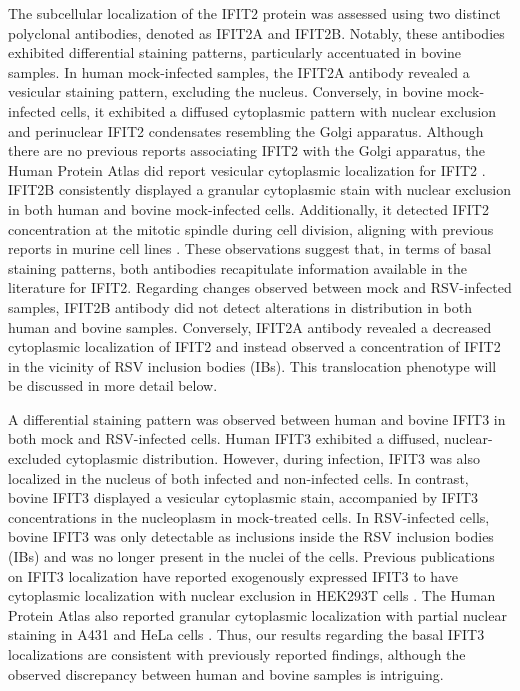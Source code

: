 The subcellular localization of the IFIT2 protein was assessed using two distinct polyclonal antibodies, denoted as IFIT2A and IFIT2B. Notably, these antibodies exhibited differential staining patterns, particularly accentuated in bovine samples. In human mock-infected samples, the IFIT2A antibody revealed a vesicular staining pattern, excluding the nucleus. Conversely, in bovine mock-infected cells, it exhibited a diffused cytoplasmic pattern with nuclear exclusion and perinuclear IFIT2 condensates resembling the Golgi apparatus. Although there are no previous reports associating IFIT2 with the Golgi apparatus, the Human Protein Atlas did report vesicular cytoplasmic localization for IFIT2 \cite{Thul2017AProteome}. IFIT2B consistently displayed a granular cytoplasmic stain with nuclear exclusion in both human and bovine mock-infected cells. Additionally, it detected IFIT2 concentration at the mitotic spindle during cell division, aligning with previous reports in murine cell lines \cite{Saha2006IdentificationProtein}. These observations suggest that, in terms of basal staining patterns, both antibodies recapitulate information available in the literature for IFIT2. Regarding changes observed between mock and RSV-infected samples, IFIT2B antibody did not detect alterations in distribution in both human and bovine samples. Conversely, IFIT2A antibody revealed a decreased cytoplasmic localization of IFIT2 and instead observed a concentration of IFIT2 in the vicinity of RSV inclusion bodies (IBs). This translocation phenotype will be discussed in more detail below.

A differential staining pattern was observed between human and bovine IFIT3 in both mock and RSV-infected cells. Human IFIT3 exhibited a diffused, nuclear-excluded cytoplasmic distribution. However, during infection, IFIT3 was also localized in the nucleus of both infected and non-infected cells. In contrast, bovine IFIT3 displayed a vesicular cytoplasmic stain, accompanied by IFIT3 concentrations in the nucleoplasm in mock-treated cells. In RSV-infected cells, bovine IFIT3 was only detectable as inclusions inside the RSV inclusion bodies (IBs) and was no longer present in the nuclei of the cells. Previous publications on IFIT3 localization have reported exogenously expressed IFIT3 to have cytoplasmic localization with nuclear exclusion in HEK293T cells \cite{Huang2008Interferon-inducedCells, Liu2011IFN-InducedTBK1}. The Human Protein Atlas also reported granular cytoplasmic localization with partial nuclear staining in A431 and HeLa cells \cite{Thul2017AProteome}. Thus, our results regarding the basal IFIT3 localizations are consistent with previously reported findings, although the observed discrepancy between human and bovine samples is intriguing.

